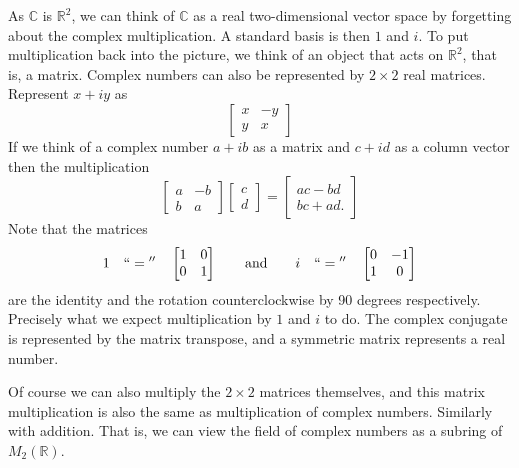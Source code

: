 \documentclass[12pt,openany]{book}
\newcommand{\C}{{\mathbb{C}}}
\newcommand{\R}{{\mathbb{R}}}
\theoremstyle{plain}
\theoremstyle{remark}
\theoremstyle{definition}
\theoremstyle{exercise}
\theoremstyle{example}
\begin{document}
As $\C$ is $\R^2$, we can think of
$\C$ as a real two-dimensional vector space by forgetting about the
complex multiplication.  A standard basis is then $1$ and $i$.
To put multiplication back into the picture, we think of an object that
acts on $\R^2$, that is, a matrix.
Complex numbers can also be represented by $2 \times 2$ real matrices.
Represent $x+iy$ as
\begin{equation*}
\begin{bmatrix}
x & -y \\
y & x
\end{bmatrix}
\end{equation*}
If we think of a complex number $a+ib$ as a matrix and $c+id$ as a column vector
then the multiplication
\begin{equation*}
\begin{bmatrix}
a & -b \\
b & a
\end{bmatrix}
\begin{bmatrix}
c \\
d 
\end{bmatrix}
=
\begin{bmatrix}
ac-bd \\
bc+ad .
\end{bmatrix}
\end{equation*}
Note that the matrices
\begin{equation*}
1 \quad ``{}={}'' \quad
\begin{bmatrix}
1 & 0 \\
0 & 1
\end{bmatrix} \qquad \text{and} \qquad
i \quad ``{}={}'' \quad
\begin{bmatrix}
0 & -1 \\
1 & 0
\end{bmatrix} 
\end{equation*}
are the identity and the rotation counterclockwise by 90 degrees
respectively.  Precisely what we expect multiplication by $1$ and $i$
to do.
The complex conjugate is represented by the
matrix transpose, and a symmetric matrix represents a real number.

Of course we can also multiply the $2 \times 2$ matrices themselves,
and this matrix multiplication is also the same as multiplication of complex
numbers.  Similarly with addition.
That is, we can view the field of complex numbers as a subring of $M_2(\R)$.
\end{document}

